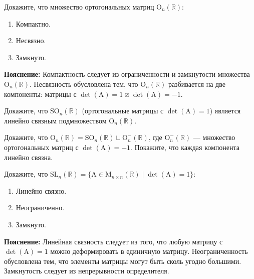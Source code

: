 \begin{task}
Докажите, что множество ортогональных матриц $\mathrm{O}_n(\mathbb{R})$:
\begin{enumerate}
	\item Компактно.
	\item Несвязно.
	\item Замкнуто.
\end{enumerate}

\textbf{Пояснение:} 
Компактность следует из ограниченности и замкнутости множества $\mathrm{O}_n(\mathbb{R})$. Несвязность обусловлена тем, что $\mathrm{O}_n(\mathbb{R})$ разбивается на две компоненты: матрицы с $\det(\mathrm{A}) = 1$ и $\det(\mathrm{A}) = -1$.
\end{task}

\begin{task}
Докажите, что $\mathrm{SO}_n(\mathbb{R})$ (ортогональные матрицы с $\det(\mathrm{A}) = 1$) является линейно связным подмножеством $\mathrm{O}_n(\mathbb{R})$.
\end{task}

\begin{task}
Докажите, что $\mathrm{O}_n(\mathbb{R}) = \mathrm{SO}_n(\mathbb{R}) \sqcup \mathrm{O}_n^{-}(\mathbb{R})$, где $\mathrm{O}_n^{-}(\mathbb{R})$ — множество ортогональных матриц с $\det(\mathrm{A}) = -1$. Покажите, что каждая компонента линейно связна.
\end{task}

\begin{task}
Докажите, что $\mathrm{SL}_n(\mathbb{R}) = \{\mathrm{A} \in \mathrm{M}_{n \times n}(\mathbb{R}) \mid \det(\mathrm{A}) = 1\}$:
\begin{enumerate}
	\item Линейно связно.
	\item Неограниченно.
	\item Замкнуто.
\end{enumerate}

\textbf{Пояснение:} 
Линейная связность следует из того, что любую матрицу с $\det(\mathrm{A}) = 1$ можно деформировать в единичную матрицу. Неограниченность обусловлена тем, что элементы матрицы могут быть сколь угодно большими. Замкнутость следует из непрерывности определителя.
\end{task}